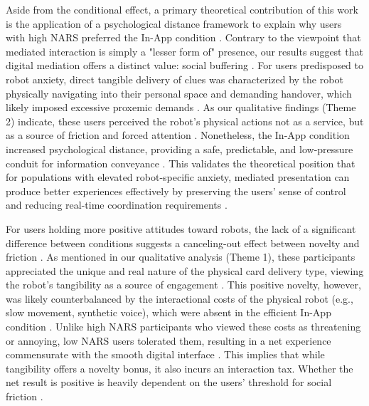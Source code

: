 \documentclass[sigconf,screen]{acmart-tagged}
\newcommand{\rev}[1]{#1}
\begin{document}
\rev{Aside from the conditional effect, a primary theoretical contribution of this work is the application of a psychological distance framework to explain why users with high NARS preferred the In-App condition \cite{gittens2024remote, li2021anthropomorphism, mumm2011human}. Contrary to the viewpoint that mediated interaction is simply a "lesser form of" presence, our results suggest that digital mediation offers a distinct value: social buffering \cite{walther1996computer, walther2011theories, plomin2023virtual}. For users predisposed to robot anxiety, direct tangible delivery of clues was characterized by the robot physically navigating into their personal space and demanding handover, which likely imposed excessive proxemic demands \cite{rahmah2025modeling, obaid2016stop, koay2014social}. As our qualitative findings (Theme 2) indicate, these users perceived the robot's physical actions not as a service, but as a source of friction and forced attention \cite{rubagotti2022perceived, li2021anthropomorphism, yeh2017exploring}. Nonetheless, the In-App condition increased psychological distance, providing a safe, predictable, and low-pressure conduit for information conveyance \cite{walther1996computer, gittens2024remote, eyssel2011effects}. This validates the theoretical position that for populations with elevated robot-specific anxiety, mediated presentation can produce better experiences effectively by preserving the users' sense of control and reducing real-time coordination requirements \cite{belhassein2022addressing, shahid2024effectiveness, legler2023emotional}.}

\rev{For users holding more positive attitudes toward robots, the lack of a significant difference between conditions suggests a canceling-out effect between novelty and friction \cite{rosen2024previous, kabacinska2025influence, fischer2021tracking, smedegaard2019reframing}. As mentioned in our qualitative analysis (Theme 1), these participants appreciated the unique and real nature of the physical card delivery type, viewing the robot's tangibility as a source of engagement \cite{smedegaard2019reframing, choi2015effect, li2015benefit}. This positive novelty, however, was likely counterbalanced by the interactional costs of the physical robot (e.g., slow movement, synthetic voice), which were absent in the efficient In-App condition \cite{irfan2024human, abendschein2022novelty}. Unlike high NARS participants who viewed these costs as threatening or annoying, low NARS users tolerated them, resulting in a net experience commensurate with the smooth digital interface \cite{hoffman2014designing, kabacinska2025influence, rosen2024previous}. This implies that while tangibility offers a novelty bonus, it also incurs an interaction tax. Whether the net result is positive is heavily dependent on the users' threshold for social friction \cite{song2025no, abendschein2022novelty, smedegaard2019reframing}.}
\end{document}
